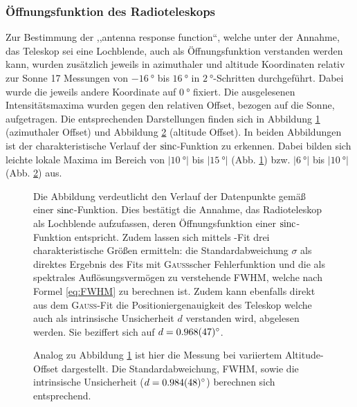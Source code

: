     \subsubsection{Öffnungsfunktion des Radioteleskops}
    Zur Bestimmung der ,,antenna response function``,
    welche unter der Annahme, das Teleskop sei eine Lochblende, auch als Öffnungsfunktion verstanden werden kann,
    wurden zusätzlich jeweils in azimuthaler und altitude Koordinaten relativ zur Sonne 17 Messungen von $\SI{-16}{\degree}$ bis $\SI{16}{\degree}$ in $\SI{2}{\degree}$-Schritten durchgeführt.
    Dabei wurde die jeweils andere Koordinate auf $\SI{0}{\degree}$ fixiert.
    Die ausgelesenen Intensitätsmaxima wurden gegen den relativen Offset, bezogen auf die Sonne, aufgetragen.
    Die entsprechenden Darstellungen finden sich in Abbildung \ref{fig:Sonnenkreuz_Az} (azimuthaler Offset) und Abbildung \ref{fig:Sonnenkreuz_Alt} (altitude Offset).
    In beiden Abbildungen ist der charakteristische Verlauf der $\operatorname{sinc}$-Funktion zu erkennen.
    Dabei bilden sich leichte lokale Maxima im Bereich von $\vert\SI{10}{\degree}\vert$ bis $\vert\SI{15}{\degree}\vert$ (Abb. \ref{fig:Sonnenkreuz_Az}) bzw. $\vert\SI{6}{\degree}\vert$ bis $\vert\SI{10}{\degree}\vert$ (Abb. \ref{fig:Sonnenkreuz_Alt}) aus.
    \begin{figure}[H]
        \centering
        
        \caption[Kreuz-Scan der Sonne, Azimutaler Offset]{Die Abbildung verdeutlicht den Verlauf der Datenpunkte gemäß einer $\operatorname{sinc}$-Funktion. Dies bestätigt die Annahme, das Radioteleskop als Lochblende aufzufassen, deren Öffnungsfunktion einer $\operatorname{sinc}$-Funktion entspricht. Zudem lassen sich mittels -Fit drei charakteristische Größen ermitteln: die Standardabweichung $\sigma$ als direktes Ergebnis des Fits mit \textsc{Gauß}scher Fehlerfunktion und die als spektrales Auflösungsvermögen zu verstehende FWHM, welche nach Formel \eqref{eq:FWHM} zu berechnen ist. Zudem kann ebenfalls direkt aus dem \textsc{Gauß}-Fit die Positioniergenauigkeit des Teleskop welche auch als intrinsische Unsicherheit $d$ verstanden wird, abgelesen werden. Sie beziffert sich auf $d = \SI{0.968 \pm 0.047}{\degree}$.}
        \label{fig:Sonnenkreuz_Az}
    \end{figure}
    \begin{figure}[H]
        \centering
        
        \caption[Kreuz-Scan der Sonne, Altitude Offset]{Analog zu Abbildung \ref{fig:Sonnenkreuz_Az} ist hier die Messung bei variiertem Altitude-Offset dargestellt. Die Standardabweichung, FWHM, sowie die intrinsische Unsicherheit ($d = \SI{0.984 \pm 0.048}{\degree}$) berechnen sich entsprechend.}
        \label{fig:Sonnenkreuz_Alt}
    \end{figure}
